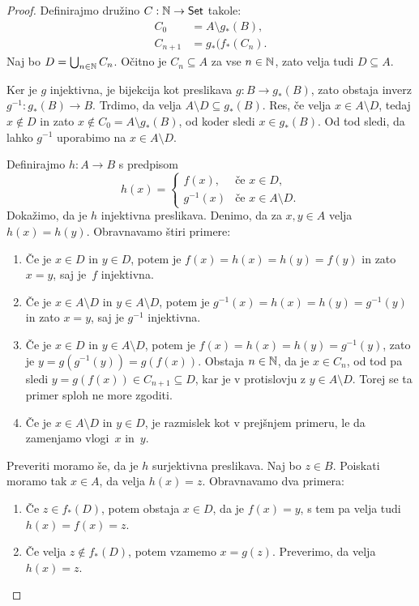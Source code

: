 \begin{proof}
  Definirajmo družino $C : \mathbb{N} \to \mathsf{Set}$ takole:
  \begin{align*}
    C_0 &= A \setminus g_{*}(B), \\
    C_{n+1} &= g_{*}(f_{*}(C_n).
  \end{align*}
  Naj bo $D = \bigcup_{n \in \mathbb{N}} C_n$. Očitno je $C_n \subseteq A$ za vse
  $n \in \mathbb{N}$, zato velja tudi $D \subseteq A$.

  Ker je $g$ injektivna, je bijekcija kot preslikava $g : B \to g_{*}(B)$, zato
  obstaja inverz $g^{-1} : g_{*}(B) \to B$. Trdimo, da velja
  $A \setminus D \subseteq g_{*}(B)$. Res, če velja $x \in A \setminus D$, tedaj
  $x \not\in D$ in zato $x \not\in C_0 = A \setminus g_{*}(B)$, od koder sledi
  $x \in g_{*}(B)$. Od tod sledi, da lahko $g^{-1}$ uporabimo na
  $x \in A \setminus D$.

  Definirajmo $h : A \to B$ s predpisom
  \begin{equation*}
    h(x) =
    \begin{cases}
      f(x), & \text{če $x \in D$,} \\
      g^{-1}(x) &\text{če $x \in A \setminus D$.}
    \end{cases}
  \end{equation*}
  Dokažimo, da je $h$ injektivna preslikava.
  Denimo, da za $x, y \in A$ velja $h(x) = h(y)$. Obravnavamo štiri primere:
  \begin{enumerate}
  \item Če je $x \in D$ in $y \in D$, potem je $f(x) = h(x) = h(y) = f(y)$ in
    zato $x = y$, saj je~$f$ injektivna.
  \item Če je $x \in A \setminus D$ in $y \in A \setminus D$, potem je
    $g^{-1}(x) = h(x) = h(y) = g^{-1}(y)$ in zato $x = y$, saj je $g^{-1}$
    injektivna.
  \item Če je $x \in D$ in $y \in A \setminus D$, potem je
    $f(x) = h(x) = h(y) = g^{-1}(y)$, zato je $y = g(g^{-1}(y)) = g(f(x))$.
    Obstaja $n \in \mathbb{N}$, da je $x \in C_n$, od tod pa sledi
    $y = g(f(x)) \in C_{n+1} \subseteq D$, kar je v protislovju z
    $y \in A \setminus D$. Torej se ta primer sploh ne more zgoditi.
  \item Če je $x \in A \setminus D$ in $y \in D$, je razmislek kot v prejšnjem
    primeru, le da zamenjamo vlogi~$x$ in~$y$.
  \end{enumerate}

  Preveriti moramo še, da je $h$ surjektivna preslikava. Naj bo $z \in B$.
  Poiskati moramo tak $x \in A$, da velja $h(x) = z$. Obravnavamo dva primera:
  \begin{enumerate}
  \item Če $z \in f_{*}(D)$, potem obstaja $x \in D$, da je $f(x) = y$, s tem pa
    velja tudi $h(x) = f(x) = z$.
  \item Če velja $z \not\in f_{*}(D)$, potem vzamemo $x = g(z)$. Preverimo, da
    velja $h(x) = z$.


\end{enumerate}
\end{proof}
